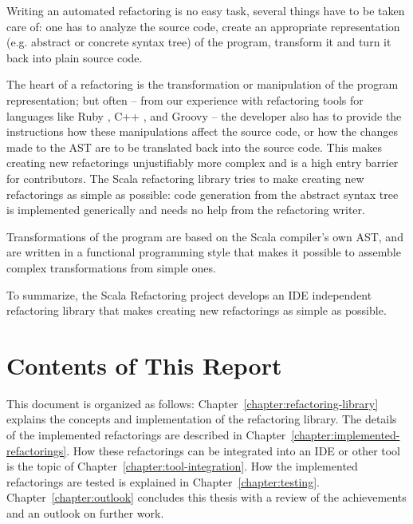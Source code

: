 \documentclass[10pt,a4paper,oneside]{scrreprt}
\begin{document}
Writing an automated refactoring is no easy task, several things have to be taken care of: one has to analyze the source code, create an appropriate representation (e.g. abstract or concrete syntax tree) of the program, transform it and turn it back into plain source code. 

The heart of a refactoring is the transformation or manipulation of the program representation; but often -- from our experience with refactoring tools for languages like Ruby \cite{RubyRefactoring}, C++ \cite{CdtOopsla}, and Groovy \cite{GroovyOopsla} -- the developer also has to provide the instructions how these manipulations affect the source code, or how the changes made to the AST are to be translated back into the source code. This makes creating new refactorings unjustifiably more complex and is a high entry barrier for contributors. The Scala refactoring library tries to make creating new refactorings as simple as possible: code generation from the abstract syntax tree is implemented generically and needs no help from the refactoring writer.

Transformations of the program are based on the Scala compiler's own AST, and are written in a functional programming style that makes it possible to assemble complex transformations from simple ones.

To summarize, the Scala Refactoring project develops an IDE independent refactoring library that makes creating new refactorings as simple as possible.


\section{Contents of This Report}

This document is organized as follows: Chapter~\vref{chapter:refactoring-library} explains the concepts and implementation of the refactoring library. The details of the implemented refactorings are described in Chapter~\vref{chapter:implemented-refactorings}. How these refactorings can be integrated into an IDE or other tool is the topic of Chapter~\vref{chapter:tool-integration}. How the implemented refactorings are tested is explained in Chapter~\vref{chapter:testing}. Chapter~\vref{chapter:outlook} concludes this thesis with a review of the achievements and an outlook on further work.
\end{document}
